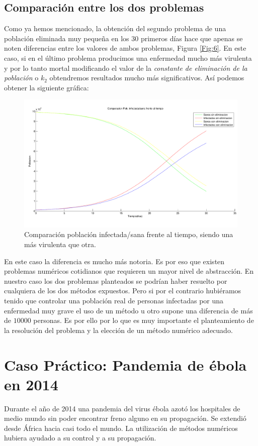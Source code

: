 \documentclass[a4paper,11pt]{article}
\numberwithin{equation}{section}
\begin{document}
\subsection{Comparación entre los dos problemas}
\indent Como ya hemos mencionado, la obtención del segundo problema de una población eliminada muy pequeña en los 30 primeros días hace que apenas se noten diferencias entre los valores de ambos problemas, Figura \ref{Fig:6}. En este caso, si en el último problema producimos una enfermedad mucho más virulenta y por lo tanto mortal modificando el valor de la \textit{constante de eliminación de la población} o $ k_2 $ obtendremos resultados mucho más significativos. Así podemos obtener la siguiente gráfica:
\begin{figure}[h!]
	\centering 		
	\includegraphics[width=1\textwidth]{grafica10.pdf}
	\caption{Comparación población infectada/sana frente al tiempo, siendo una más virulenta que otra.}
	\label{Fig:10}
\end{figure}

\indent En este caso la diferencia es mucho más notoria. Es por eso que existen problemas numéricos cotidianos que requieren un mayor nivel de abstracción. En nuestro caso los dos problemas planteados se podrían haber resuelto por cualquiera de los dos métodos expuestos. Pero si por el contrario hubiéramos tenido que controlar una población real de personas infectadas por una enfermedad muy grave el uso de un método u otro supone una diferencia de más de $ 10000 $ personas. Es por ello por lo que es muy importante el planteamiento de la resolución del problema y la elección de un método numérico adecuado. 


\newpage
\section{Caso Práctico: Pandemia de ébola en 2014}
\indent Durante el año de 2014 una pandemia del virus ébola azotó los hospitales de medio mundo sin poder encontrar freno alguno en su propagación. Se extendió desde África hacia casi todo el mundo. La utilización de métodos numéricos hubiera ayudado a su control y a su propagación.
\end{document}
